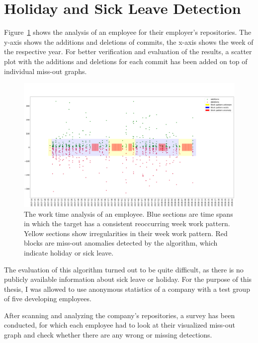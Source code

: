 \section{Holiday and Sick Leave Detection}

Figure~\ref{fig:missing-time} shows the analysis of an employee for their employer's repositories.
The y-axis shows the additions and deletions of commits, the x-axis shows the week of the respective year.
For better verification and evaluation of the results, a scatter plot with the additions and deletions for each commit has been added on top of individual miss-out graphs.

\begin{figure}[h]
    \includegraphics[scale=0.19]{./graphs/analysis/work-time-analysis}
    \centering
    \caption{
        The work time analysis of an employee.
        Blue sections are time spans in which the target has a consistent reoccurring week work pattern.
        Yellow sections show irregularities in their week work pattern.
        Red blocks are miss-out anomalies detected by the algorithm, which indicate holiday or sick leave.
    }\label{fig:missing-time}
\end{figure}

The evaluation of this algorithm turned out to be quite difficult, as there is no publicly available information about sick leave or holiday.
For the purpose of this thesis, I was allowed to use anonymous statistics of a company with a test group of five developing employees.

After scanning and analyzing the company's repositories, a survey has been conducted, for which each employee had to look at their visualized miss-out graph and check whether there are any wrong or missing detections.

